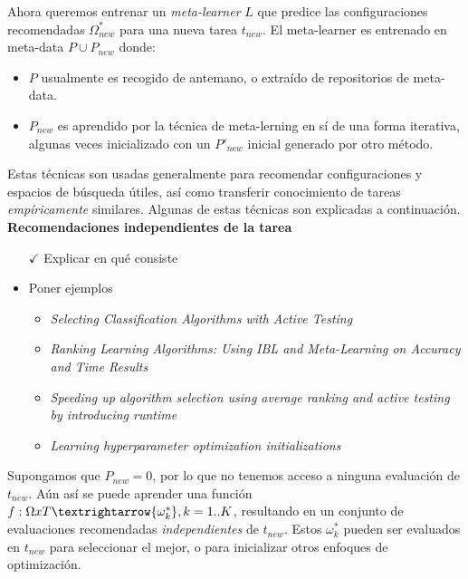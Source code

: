 Ahora queremos entrenar un \emph{meta-learner} $L$ que predice las configuraciones recomendadas $\Omega^*_{new}$ para una nueva tarea $t_{new}$. El meta-learner es entrenado en meta-data $P\cup P_{new}$ donde:

\begin{itemize}
	\item $P$ usualmente es recogido de antemano, o extraído de repositorios de meta-data.
	\item $P_{new}$ es aprendido por la técnica de meta-lerning en sí de una forma iterativa, algunas veces inicializado con un $P'_{new}$ inicial generado por otro método.
\end{itemize}

Estas técnicas son usadas generalmente para recomendar configuraciones y espacios de búsqueda útiles, así como transferir conocimiento de tareas \textit{empíricamente} similares. Algunas de estas técnicas son explicadas a continuación. \\

\textbf{Recomendaciones independientes de la tarea}

\begin{itemize}
	\item[$\checkmark$] Explicar en qué consiste
	\item Poner ejemplos
	\begin{itemize}
		\item \textit{Selecting Classification Algorithms with Active Testing}
		\item \textit{Ranking Learning Algorithms: Using IBL and Meta-Learning on Accuracy and Time Results}
		\item \textit{Speeding up algorithm selection using average ranking and active testing by introducing runtime}
		\item \textit{Learning hyperparameter optimization initializations}
	\end{itemize}
\end{itemize}

Supongamos que $P_{new} = 0$, por lo que no tenemos acceso a ninguna evaluación de $t_{new}$. Aún así se puede aprender una función $f: \Omega x T \textrightarrow \{\omega^*_k\}, k=1..K$, resultando en un conjunto de evaluaciones recomendadas \textit{independientes} de $t_{new}$. Estos $\omega^*_k$ pueden ser evaluados en $t_{new}$ para seleccionar el mejor, o para inicializar otros enfoques de optimización.

